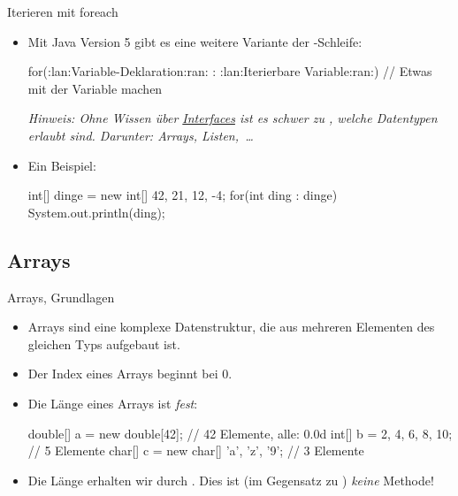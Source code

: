 \begin{frame}[fragile]{Iterieren mit foreach}
    \begin{itemize}[<+(1)->]
        \widei
        \item Mit Java Version 5 gibt es eine weitere Variante der -Schleife:\pause{}
\begin{plainjava}
for(:lan:Variable-Deklaration:ran: : :lan:Iterierbare Variable:ran:) {
    // Etwas mit der Variable machen
}
\end{plainjava}
        \pause{}\textit{Hinweis: Ohne Wissen über \hyperref[mrk:int-iterable]{Interfaces} ist es schwer zu , welche Datentypen erlaubt sind.\pause{} Darunter: Arrays, Listen,~\ldots}
        \item Ein Beispiel:\pause{}
\begin{plainjava}
int[] dinge = new int[] {42, 21, 12, -4};
for(int ding : dinge){
    System.out.println(ding);
}
\end{plainjava}
    \end{itemize}
\end{frame}

\subsection{Arrays}
\begin{frame}[fragile]{Arrays, Grundlagen}
    \begin{itemize}[<+(1)->]
        \widei
        \item Arrays sind eine komplexe Datenstruktur,\pause{} die aus mehreren Elementen des gleichen Typs aufgebaut ist.
        \item Der Index eines Arrays beginnt bei \(0\).
        \item Die Länge eines Arrays ist \emph{fest}:\pause{}
\begin{plainjava}
double[] a = new double[42]; // 42 Elemente, alle: 0.0d
int[] b = {2, 4, 6, 8, 10}; // 5 Elemente
char[] c = new char[] {'a', 'z', '9'}; // 3 Elemente
\end{plainjava}
        \item Die Länge erhalten wir durch .\pause{} Dies ist (im Gegensatz zu ) \emph{keine} Methode!
    \end{itemize}
\end{frame}

